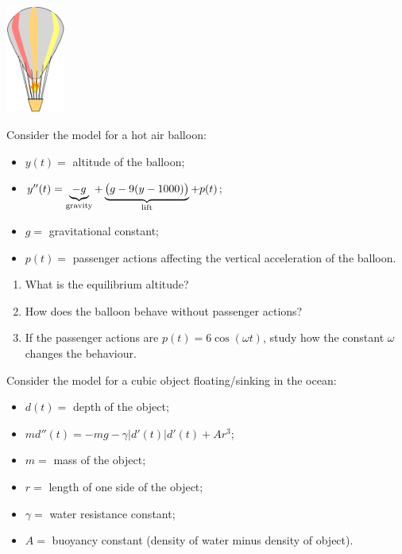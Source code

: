 
\begin{exercises}

	\begin{center}
		\includegraphics*[height=100pt]{images/module20-hotairballoon.pdf}
	\end{center}

	\begin{problist}
	
	\prob Consider the model for a hot air balloon:
	\begin{itemize}
		\item $y(t) = $ altitude of the balloon;
		\item $y''(t) = \underbrace{-g}_{\rm gravity} + \underbrace{\big( g - 9 (y-1000) \big)}_{\rm lift} + p(t)$;
		\item $g=$ gravitational constant;
		\item $p(t)=$ passenger actions affecting the vertical acceleration of the balloon.
	\end{itemize}
	\begin{enumerate}
		\item What is the equilibrium altitude?
		\item How does the balloon behave without passenger actions?
		\item If the passenger actions are $p(t) = 6 \cos(\omega t)$, study how the constant $\omega$ changes the behaviour.
	\end{enumerate}
	

	

	\prob Consider the model for a cubic object floating/sinking in the ocean:
	\begin{itemize}
		\item $d(t) = $ depth of the object;
		\item $m d''(t)  = -mg - \gamma \big|d'(t)\big| d'(t) + A r^3$;
		\item $m=$ mass of the object;
		\item $r=$ length of one side of the object;
		\item $\gamma=$ water resistance constant;
		\item $A=$ buoyancy constant (density of water minus density of object).
	\end{itemize}


\end{problist}
\end{exercises}
